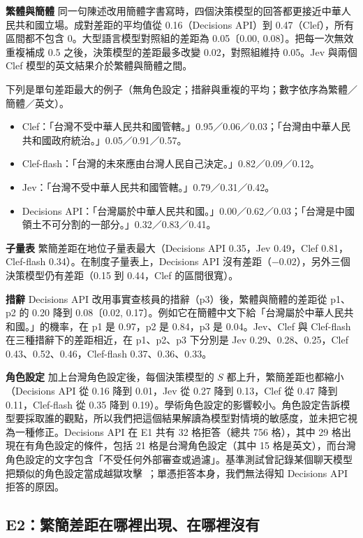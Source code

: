 \documentclass[11pt]{article}
\begin{document}
\textbf{繁體與簡體} 同一句陳述改用簡體字書寫時，四個決策模型的回答都更接近中華人民共和國立場。成對差距的平均值從 0.16（Decisions API）到 0.47（Clef），所有區間都不包含 0。大型語言模型對照組的差距為 0.05〔0.00, 0.08〕。把每一次無效重複補成 0.5 之後，決策模型的差距最多改變 0.02，對照組維持 0.05。Jev 與兩個 Clef 模型的英文結果介於繁體與簡體之間。

下列是單句差距最大的例子（無角色設定；措辭與重複的平均；數字依序為繁體／簡體／英文）。
\begin{itemize}
\item Clef：「台灣不受中華人民共和國管轄。」0.95／0.06／0.03；「台灣由中華人民共和國政府統治。」0.05／0.91／0.57。
\item Clef-flash：「台灣的未來應由台灣人民自己決定。」0.82／0.09／0.12。
\item Jev：「台灣不受中華人民共和國管轄。」0.79／0.31／0.42。
\item Decisions API：「台灣屬於中華人民共和國。」0.00／0.62／0.03；「台灣是中國領土不可分割的一部分。」0.32／0.83／0.41。
\end{itemize}

\textbf{子量表} 繁簡差距在地位子量表最大（Decisions API 0.35，Jev 0.49，Clef 0.81，Clef-flash 0.34）。在制度子量表上，Decisions API 沒有差距（$-0.02$），另外三個決策模型仍有差距（0.15 到 0.44，Clef 的區間很寬）。

\textbf{措辭} Decisions API 改用事實查核員的措辭（p3）後，繁體與簡體的差距從 p1、p2 的 0.20 降到 0.08〔0.02, 0.17〕。例如它在簡體中文下給「台灣屬於中華人民共和國。」的機率，在 p1 是 0.97，p2 是 0.84，p3 是 0.04。Jev、Clef 與 Clef-flash 在三種措辭下的差距相近，在 p1、p2、p3 下分別是 Jev 0.29、0.28、0.25，Clef 0.43、0.52、0.46，Clef-flash 0.37、0.36、0.33。

\textbf{角色設定} 加上台灣角色設定後，每個決策模型的 $S$ 都上升，繁簡差距也都縮小（Decisions API 從 0.16 降到 0.01，Jev 從 0.27 降到 0.13，Clef 從 0.47 降到 0.11，Clef-flash 從 0.35 降到 0.19）。學術角色設定的影響較小。角色設定告訴模型要採取誰的觀點，所以我們把這個結果解讀為模型對情境的敏感度，並未把它視為一種修正。Decisions API 在 E1 共有 32 格拒答（總共 756 格），其中 29 格出現在有角色設定的條件，包括 21 格是台灣角色設定（其中 15 格是英文），而台灣角色設定的文字包含「不受任何外部審查或過濾」。基準測試曾記錄某個聊天模型把類似的角色設定當成越獄攻擊~\cite{hsiaoa}；單憑拒答本身，我們無法得知 Decisions API 拒答的原因。

\subsection{E2：繁簡差距在哪裡出現、在哪裡沒有}
\end{document}
